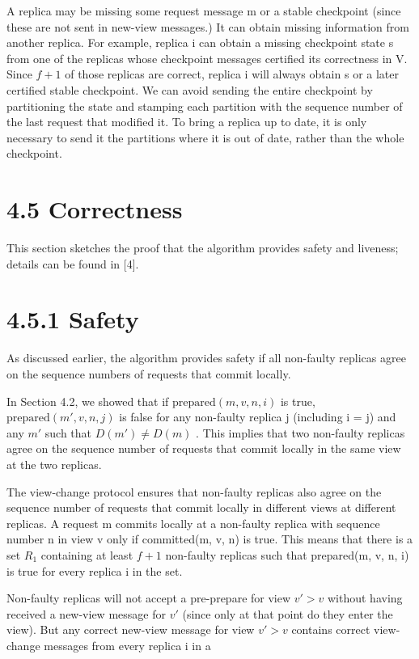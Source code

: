 \documentclass[
]{article}
\begin{document}
A replica may be missing some request message m or a stable checkpoint
(since these are not sent in new-view messages.) It can obtain missing
information from another replica. For example, replica i can obtain a
missing checkpoint state s from one of the replicas whose checkpoint
messages certified its correctness in V. Since \(f + 1\) of those
replicas are correct, replica i will always obtain s or a later
certified stable checkpoint. We can avoid sending the entire checkpoint
by partitioning the state and stamping each partition with the sequence
number of the last request that modified it. To bring a replica up to
date, it is only necessary to send it the partitions where it is out of
date, rather than the whole checkpoint.

\section{4.5 Correctness}\label{correctness}

This section sketches the proof that the algorithm provides safety and
liveness; details can be found in {[}4{]}.

\section{4.5.1 Safety}\label{safety}

As discussed earlier, the algorithm provides safety if all non-faulty
replicas agree on the sequence numbers of requests that commit locally.

In Section 4.2, we showed that if \(\text{prepared}(m, v, n, i)\) is
true, \(\text{prepared}(m', v, n, j)\) is false for any non-faulty
replica j (including i = j) and any \(m'\) such that \(D(m') \neq D(m)\)
. This implies that two non-faulty replicas agree on the sequence number
of requests that commit locally in the same view at the two replicas.

The view-change protocol ensures that non-faulty replicas also agree on
the sequence number of requests that commit locally in different views
at different replicas. A request m commits locally at a non-faulty
replica with sequence number n in view v only if committed(m, v, n) is
true. This means that there is a set \(R_{1}\) containing at least
\(f + 1\) non-faulty replicas such that prepared(m, v, n, i) is true for
every replica i in the set.

Non-faulty replicas will not accept a pre-prepare for view \(v' > v\)
without having received a new-view message for \(v'\) (since only at
that point do they enter the view). But any correct new-view message for
view \(v' > v\) contains correct view-change messages from every replica
i in a
\end{document}
